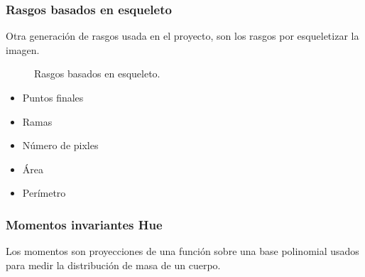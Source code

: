 \documentclass[a4paper, 11pt]{article}
\begin{document}
\subsubsection{Rasgos basados en esqueleto}

Otra generación de rasgos usada en el proyecto, son los rasgos por esqueletizar la imagen.

\begin{figure}[ht]%
    \centering
    \qquad
    \caption{Rasgos basados en esqueleto.}%
    \label{entropia}%
\end{figure}

\begin{itemize}
\item Puntos finales
\item Ramas
\item Número de pixles
\item Área
\item Perímetro
\end{itemize}

\subsubsection{Momentos invariantes Hue}

Los momentos son proyecciones de una función sobre una base polinomial usados para medir la distribución de masa de un cuerpo.
\end{document}
